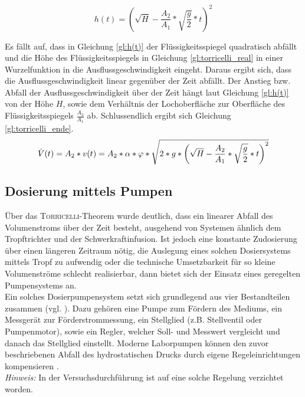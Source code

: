 \begin{equation}
	\label{gl:h(t)}
	h(t) = \left(\sqrt{H}-\frac{A_2}{A_1}*\sqrt{\frac{g}{2}}*t\right)^2
\end{equation}

Es fällt auf, dass in Gleichung \eqref{gl:h(t)} der Flüssigkeitsspiegel quadratisch abfällt und die Höhe des Flüssigkeitsspiegels in Gleichung \eqref{gl:torricelli_real} in einer Wurzelfunktion in die Ausflussgeschwindigkeit eingeht. Daraus ergibt sich, dass die Ausflussgeschwindigkeit linear gegenüber der Zeit abfällt. Der Anstieg bzw. Abfall der Ausflussgeschwindigkeit über der Zeit hängt laut Gleichung \eqref{gl:h(t)} von der Höhe $H$, sowie dem Verhältnis der Lochoberfläche zur Oberfläche des Flüssigkeitsspiegels $\frac{A_2}{A_1}$ ab. Schlussendlich ergibt sich Gleichung \eqref{gl:torricelli_ende}.
\begin{equation}
	\label{gl:torricelli_ende}
	\dot{V}(t) = A_2*v(t) =  A_2*\alpha*\varphi*\sqrt{2*g*\left(\sqrt{H}-\frac{A_2}{A_1}*\sqrt{\frac{g}{2}}*t\right)^2} \\
\end{equation}

\subsection{Dosierung mittels Pumpen}
Über das \textsc{Torricelli}-Theorem wurde deutlich, dass ein linearer Abfall des Volumenstroms über der Zeit besteht, ausgehend von Systemen ähnlich dem Tropftrichter und der Schwerkraftinfusion. Ist jedoch eine konstante Zudosierung über einen längeren Zeitraum nötig, die Auslegung eines solchen Dosiersystems mittels Tropf zu aufwendig oder die technische Umsetzbarkeit für so kleine Volumenströme schlecht realisierbar, dann bietet sich der Einsatz eines geregelten Pumpensystems an. \\
Ein solches Dosierpumpensystem setzt sich grundlegend aus vier Bestandteilen zusammen (vgl. \cite{Ignatowitz.2013}). Dazu gehören eine Pumpe zum Fördern des Mediums, ein Messgerät zur Förderstrommessung, ein Stellglied (z.B. Stellventil oder Pumpenmotor), sowie ein Regler, welcher Soll- und Messwert vergleicht und danach das Stellglied einstellt. 
\newpage
Moderne Laborpumpen können den zuvor beschriebenen Abfall des hydrostatischen Drucks durch eigene Regeleinrichtungen kompensieren \cite{https:www.industr.com.16.06.2021}.\\
\textit{Hinweis:} In der Versuchsdurchführung ist auf eine solche Regelung verzichtet worden.

